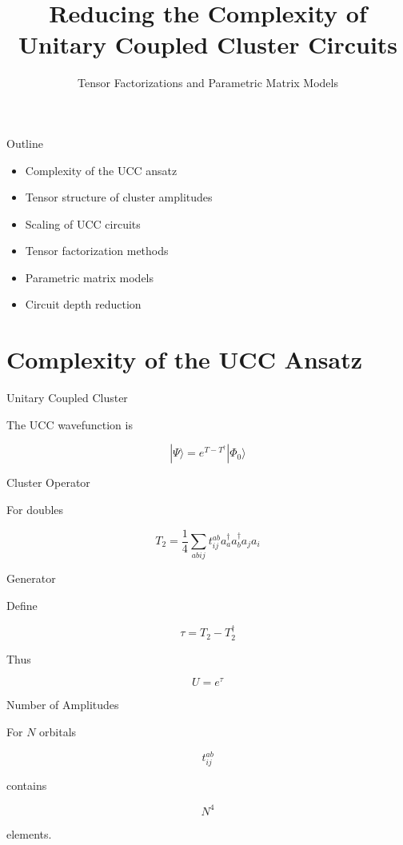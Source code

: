 \documentclass{beamer}
\title{Reducing the Complexity of Unitary Coupled Cluster Circuits}
\subtitle{Tensor Factorizations and Parametric Matrix Models}
\author{}
\date{}
\begin{document}
\frame{\titlepage}

\begin{frame}{Outline}

\begin{itemize}
\item Complexity of the UCC ansatz
\item Tensor structure of cluster amplitudes
\item Scaling of UCC circuits
\item Tensor factorization methods
\item Parametric matrix models
\item Circuit depth reduction
\end{itemize}

\end{frame}

\section{Complexity of the UCC Ansatz}

\begin{frame}{Unitary Coupled Cluster}

The UCC wavefunction is

\[
|\Psi\rangle =
e^{T-T^\dagger}|\Phi_0\rangle
\]

\end{frame}

\begin{frame}{Cluster Operator}

For doubles

\[
T_2 =
\frac{1}{4}
\sum_{abij}
t_{ij}^{ab}
a_a^\dagger a_b^\dagger a_j a_i
\]

\end{frame}


\begin{frame}{Generator}

  Define

  \[
  \tau = T_2 - T_2^\dagger
  \]

  Thus

  \[
  U = e^\tau
  \]

\end{frame}

\begin{frame}{Number of Amplitudes}

  For $N$ orbitals

  \[
  t_{ij}^{ab}
  \]

  contains

  \[
  N^4
  \]

  elements.

\end{frame}
\end{document}
